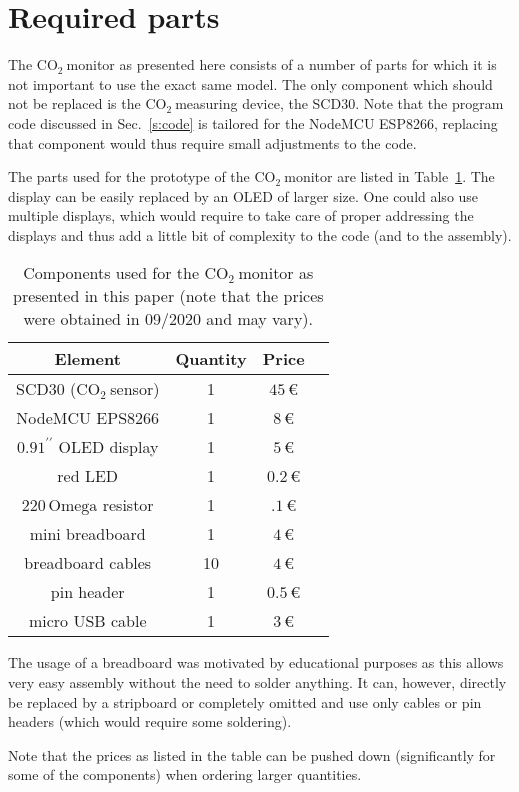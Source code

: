 \documentclass[12pt,a4paper]{article}
\newcommand{\inchsign}{^{\prime\prime}}
\newcommand{\coo}{\ensuremath{\mathrm{CO_2}~}}
\begin{document}
\section{Required parts}
The \coo monitor as presented here consists of a number of parts for which it is not important to use the exact same model. The only component which should not be replaced is the \coo measuring device, the SCD30. Note that the program code discussed in Sec.~\ref{s:code} is tailored for the NodeMCU ESP8266, replacing that component would thus require small adjustments to the code. 

The parts used for the prototype of the \coo monitor are listed in Table~\ref{t:parts}. The display can be easily replaced by an OLED of larger size. One could also use multiple displays, which would require to take care of proper addressing the displays and thus add a little bit of complexity to the code (and to the assembly). 
\begin{table}\label{t:parts}
\center
\begin{tabular}{cccc}\toprule
Element & Quantity & Price \\\hline
SCD30 (\coo sensor) & 1 & $45\,$\euro \\
NodeMCU EPS8266 & 1 & $8\,$\euro \\
$0.91\inchsign$ OLED display	& 1	& $5\,$\euro \\
red LED					& 1 	& $0.2\,$\euro \\
$220\,\mathrm{Omega}$ resistor	& 1	& $.1\,$\euro \\
mini breadboard		& 1 & $4\,$\euro \\
breadboard cables	& 10 & $4\,$\euro \\
pin header			& 1 & $0.5\,$\euro \\
micro USB cable		& 1 & $3\,$\euro \\
\bottomrule
\end{tabular}
\caption{Components used for the \coo monitor as presented in this paper (note that the prices were obtained in 09/2020 and may vary).}
\end{table}

The usage of a breadboard was motivated by educational purposes as this allows very easy assembly without the need to solder anything. It can, however, directly be replaced by a stripboard or completely omitted and use only cables or pin headers (which would require some soldering). 

Note that the prices as listed in the table can be pushed down (significantly for some of the components) when ordering larger quantities. 
\end{document}
